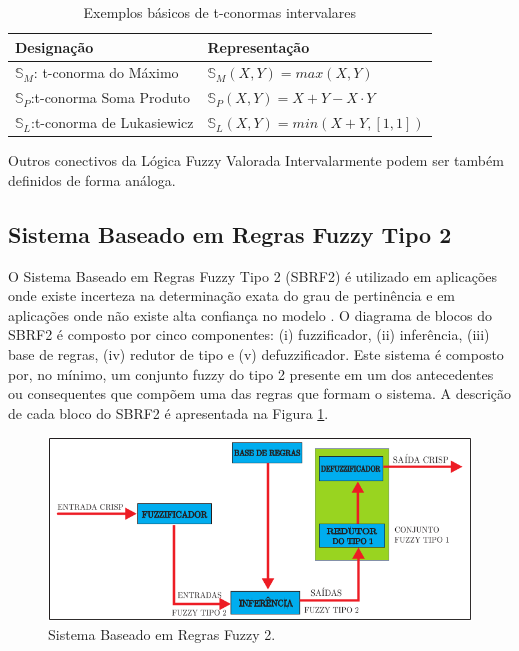 \documentclass[tcc,capa]{texufpel}
\begin{document}
\begin{center}
\begin{table}[h]
\caption{{\small Exemplos básicos de t-conormas intervalares}}
\centering
\label{tabconormasint}
\begin{tabular}{ll} \hline


Designação & Representação  \\
\hline
$\mathbb{S}_{M}$: t-conorma do Máximo&  $\mathbb{S}_{M}(X,Y)=max(X,Y)$   \\
$\mathbb{S}_{P}$:t-conorma Soma Produto &  $\mathbb{S}_{P}(X,Y)=X+Y-X\cdot Y$   \\
$\mathbb{S}_{L}$:t-conorma de  Lukasiewicz&  $\mathbb{S}_{L}(X,Y)=min(X+Y,[1,1])$  \\
\hline
\end{tabular}
\end{table}
\end{center}

Outros conectivos da Lógica Fuzzy Valorada Intervalarmente podem ser também definidos de forma análoga.

\subsection{Sistema Baseado em Regras Fuzzy Tipo 2}

O Sistema Baseado em Regras Fuzzy Tipo 2 (SBRF2) é utilizado em aplicações onde existe incerteza na determinação exata do grau de pertinência e em aplicações onde não existe alta confiança no modelo \citep{rizol2011logica}.
O diagrama de blocos do SBRF2 é composto por cinco componentes: (i) fuzzificador, (ii) inferência, (iii) base de regras, (iv) redutor de tipo e (v) defuzzificador. Este sistema é composto por, no mínimo, um conjunto fuzzy do tipo 2 presente em um dos antecedentes ou consequentes que compõem uma das regras que formam o sistema. A descrição de cada bloco do SBRF2 é apresentada na Figura \ref{fig:sbrf2}.

\begin{figure}[h]
\centering
\includegraphics[scale=0.6]{images/sbrf2_dia_bloco.png}
\caption{Sistema Baseado em Regras Fuzzy 2.} %
\label{fig:sbrf2}
\end{figure}
\end{document}
